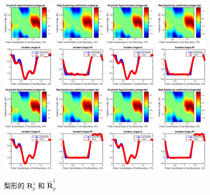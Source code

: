 {\begin{figure}[htbp]
	\centering
	\includegraphics[width=0.48\textwidth]{./Img/figure_sc_elastic/sc_p1_pear_1.eps}
	\includegraphics[width=0.48\textwidth]{./Img/figure_sc_elastic/sc_p1_pear_2.eps}
	\includegraphics[width=0.48\textwidth]{./Img/figure_sc_elastic/sc_p1_pear_4.eps}
	\includegraphics[width=0.48\textwidth]{./Img/figure_sc_elastic/sc_p1_pear_8.eps}		
	\caption{梨形的 $\mathbf{R}_p^1$ 和 $\hat {\mathbf{R}}_p^1$ }\label{figure_6}
\end{figure}



}
